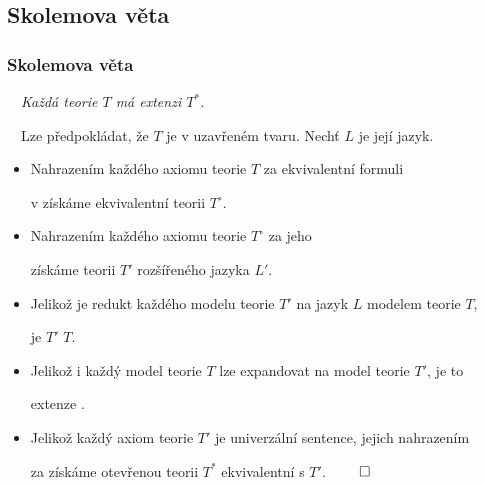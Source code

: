 \subsection{Skolemova věta}\todo

\subsubsection*{Skolemova věta}
    
    {\bf {}}\ \ {\it Každá teorie $T$ má  extenzi $T^*$.}
    \medskip
    
    {\it {}}\ \ Lze předpokládat, že $T$ je v uzavřeném tvaru. Nechť $L$ je její jazyk.
    \vspace{0.5mm}
    
    \begin{itemize}
    \item Nahrazením každého axiomu teorie $T$ za ekvivalentní formuli
    \vspace{0.5mm}
    
    v  získáme ekvivalentní teorii $T^\circ$.
    \vspace{0.5mm}
    
    \item Nahrazením každého axiomu teorie $T^\circ$ za jeho 
    \vspace{0.5mm}
    
    získáme teorii $T'$ rozšířeného jazyka $L'$.
    \vspace{0.5mm}
    
    \item Jelikož je redukt každého modelu teorie $T'$ na jazyk $L$ modelem teorie $T$,
    \vspace{0.5mm}
    
    je $T'$  $T$.
    \vspace{0.5mm}
    
    \item Jelikož i každý model teorie $T$ lze expandovat na model teorie $T'$, je to
    \vspace{0.5mm}
    
    extenze .
    \vspace{0.5mm}
    
    \item Jelikož každý axiom teorie $T'$ je univerzální sentence, jejich nahrazením
    \vspace{0.5mm}
    
    za  získáme otevřenou teorii $T^*$ ekvivalentní s $T'$. $\qed$
    \end{itemize}
    \medskip
    
